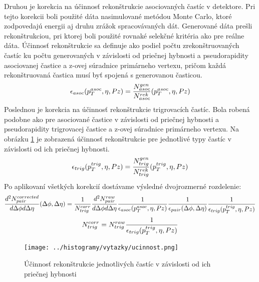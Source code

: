 \documentclass[thesismargins, thesislinespacing]{rnthesis}
\begin{document}
Druhou je korekcia na účinnosť rekonštrukcie asociovaných častíc v detektore. Pri tejto korekcii boli použité dáta nasimulované metódou Monte Carlo, ktoré zodpovedajú energii aj druhu zrážok spracovávaných dát. Generované dáta prešli \-re\-kon\-štruk\-ciou, pri ktorej boli použité rovnaké selekčné kritéria ako pre reálne dáta. Účinnosť re\-kon\-štruk\-cie sa definuje ako podiel počtu zrekonštruovaných častíc ku počtu generovaných v závislosti od priečnej hybnosti a  pseudorapidity asociovanej častice a z-ovej súradnice primárneho vertexu, pričom každá rekonštruovaná častica musí byť spojená s generovanou časticou.  
\begin{equation}
\footnotesize
\epsilon_{asoc}(p_{T}^{asoc},\eta,Pz) = \frac{N_{asoc}^{gen}}{N_{asoc}^{rek}}(p_{T}^{asoc},\eta,Pz)
\end{equation}
Poslednou je korekcia na účinnosť rekonštrukcie trigrovacích častíc. Bola robená podobne ako pre asociované častice v závislosti od priečnej hybnosti a  pseudorapidity trigrovacej častice a z-ovej súradnice primárneho vertexu. Na obrázku \ref{uc} je zobrazená účinnosť rekonštrukcie pre jednotlivé typy častíc v závislosti od ich priečnej hybnosti.
\begin{equation}
\footnotesize
\epsilon_{trig}(p_{T}^{trig},\eta,Pz) = \frac{N_{trig}^{gen}}{N_{trig}^{rek}}(p_{T}^{trig},\eta,Pz)
\end{equation}
\begin{equation}\end{equation}
Po aplikovaní všetkých korekcií dostávame výsledné dvojrozmerné rozdelenie:
\begin{equation}
\footnotesize
\frac{d^2N^{corrected}_{pair}}{d\Delta\phi d\Delta\eta}(\Delta\phi,\Delta \eta)=
\frac{1}{N^{corr}_{trig}} \frac{d^2N^{raw}_{pair}}{d\Delta\phi d\Delta\eta} \frac{1}{\epsilon_{asoc}(p_{T}^{asoc},\eta,Pz)}\frac{1}{\epsilon_{pair}(\Delta\phi,\Delta\eta)}
\frac{1}{\epsilon_{trig}(p_{T}^{trig},\eta,Pz)}
\end{equation}
\begin{equation}
\footnotesize
N^{corr}_{trig}=N^{raw}_{trig}\frac{1}{\epsilon_{trig}(p_{T}^{trig},\eta,Pz)}
\end{equation}

\begin{figure}[hbtp!]
	\centering
	\texttt{[image: ../histogramy/vytazky/ucinnost.png]}
	\caption{Účinnosť rekonštrukcie jednotlivých častíc v závislosti od ich priečnej hybnosti}
	\label{uc}
\end{figure}
\end{document}
